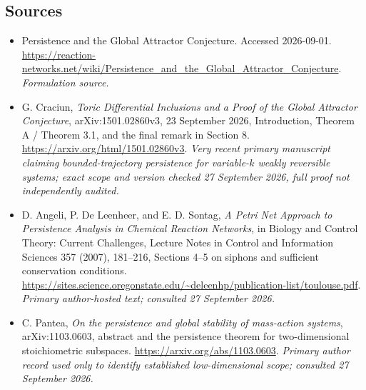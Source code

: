 \documentclass[11pt]{article}
\begin{document}
\subsection{Sources}
\begin{itemize}
\item[S1]Persistence and the Global Attractor Conjecture. Accessed 2026-09-01.
\url{https://reaction-networks.net/wiki/Persistence_and_the_Global_Attractor_Conjecture}.
\textit{Formulation source.}
\item[E1] G. Craciun, \emph{Toric Differential Inclusions and a Proof of
the Global Attractor Conjecture}, arXiv:1501.02860v3,
23 September 2026, Introduction, Theorem A / Theorem 3.1,
and the final remark in Section 8.
\url{https://arxiv.org/html/1501.02860v3}.
\textit{Very recent primary manuscript claiming bounded-trajectory
persistence for variable-$k$ weakly reversible systems; exact scope and
version checked 27 September 2026, full proof not independently audited.}
\item[E2] D. Angeli, P. De Leenheer, and E. D. Sontag,
\emph{A Petri Net Approach to Persistence Analysis in Chemical Reaction
Networks}, in Biology and Control Theory: Current Challenges,
Lecture Notes in Control and Information Sciences 357 (2007), 181--216,
Sections 4--5 on siphons and sufficient conservation conditions.
\url{https://sites.science.oregonstate.edu/~deleenhp/publication-list/toulouse.pdf}.
\textit{Primary author-hosted text; consulted 27 September 2026.}
\item[E3] C. Pantea, \emph{On the persistence and global stability of
mass-action systems}, arXiv:1103.0603,
abstract and the persistence theorem for two-dimensional stoichiometric
subspaces.
\url{https://arxiv.org/abs/1103.0603}.
\textit{Primary author record used only to identify established low-dimensional
scope; consulted 27 September 2026.}
\end{itemize}
\end{document}
